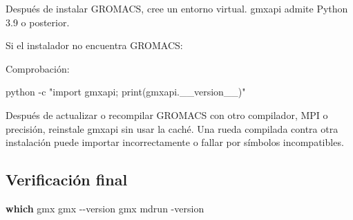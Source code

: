 \documentclass[
  spanish,
  11pt,
  a4paper]{article}
\newenvironment{Shaded}{\begin{snugshade}}{\end{snugshade}}
\newcommand{\AttributeTok}[1]{\textcolor[rgb]{0.13,0.29,0.53}{#1}}
\newcommand{\BuiltInTok}[1]{#1}
\newcommand{\ExtensionTok}[1]{#1}
\newcommand{\FunctionTok}[1]{\textcolor[rgb]{0.13,0.29,0.53}{\textbf{#1}}}
\newcommand{\NormalTok}[1]{#1}
\newcommand{\OperatorTok}[1]{\textcolor[rgb]{0.81,0.36,0.00}{\textbf{#1}}}
\newcommand{\StringTok}[1]{\textcolor[rgb]{0.31,0.60,0.02}{#1}}
\newcommand{\VariableTok}[1]{\textcolor[rgb]{0.00,0.00,0.00}{#1}}
\begin{document}
Después de instalar GROMACS, cree un entorno virtual. gmxapi admite
Python 3.9 o posterior.

\begin{Shaded}
\end{Shaded}

Si el instalador no encuentra GROMACS:

\begin{Shaded}
\end{Shaded}

Comprobación:

\begin{Shaded}
\begin{Highlighting}[]
\ExtensionTok{python} \AttributeTok{{-}c} \StringTok{"import gmxapi; print(gmxapi.\_\_version\_\_)"}
\end{Highlighting}
\end{Shaded}

Después de actualizar o recompilar GROMACS con otro compilador, MPI o
precisión, reinstale gmxapi sin usar la caché. Una rueda compilada
contra otra instalación puede importar incorrectamente o fallar por
símbolos incompatibles.

\subsection{Verificación final}\label{verificaciuxf3n-final}

\begin{Shaded}
\begin{Highlighting}[]
\FunctionTok{which}\NormalTok{ gmx}
\ExtensionTok{gmx} \AttributeTok{{-}{-}version}
\ExtensionTok{gmx}\NormalTok{ mdrun }\AttributeTok{{-}version}
\end{Highlighting}
\end{Shaded}
\end{document}

